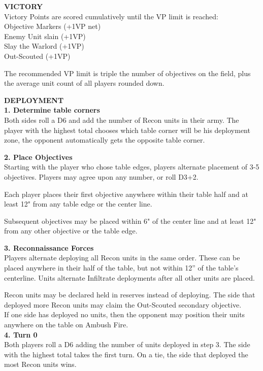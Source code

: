 \documentclass[letterpaper,twocolumn,oneside,titlepage]{book}
\begin{document}
\textbf{VICTORY}\\
Victory Points are scored cumulatively until the VP limit is reached:\\
Objective Markers (+1VP net)\\
Enemy Unit slain (+1VP)\\
Slay the Warlord (+1VP)\\
Out-Scouted (+1VP)

The recommended VP limit is triple the number of objectives on the
field, plus the average unit count of all players rounded down.

\textbf{DEPLOYMENT}\\
\textbf{1. Determine table corners}\\
Both sides roll a D6 and add the number of Recon units in their army.
The player with the highest total chooses which table corner will be his
deployment zone, the opponent automatically gets the opposite table
corner.

\textbf{2. Place Objectives}\\
Starting with the player who chose table edges, players alternate placement
of 3-5 objectives. Players may agree upon any number, or roll D3+2.

Each player places their first objective anywhere within their table half and
at least 12" from any table edge or the center line.

Subsequent objectives may be placed within 6" of the center line and at least
12" from any other objective or the table edge.



\textbf{3. Reconnaissance Forces}\\
Players alternate deploying all Recon units in the same order. These can
be placed anywhere in their half of the table, but not within 12'' of
the table's centerline. Units alternate Infiltrate deployments after all
other units are placed.

Recon units may be declared held in reserves instead of deploying. The
side that deployed more Recon units may claim the Out-Scouted secondary
objective.\\
If one side has deployed no units, then the opponent may position their
units anywhere on the table on Ambush Fire.\\
\textbf{4. Turn 0}\\
Both players roll a D6 adding the number of units deployed in step 3.
The side with the highest total takes the first turn. On a tie, the side
that deployed the most Recon units wins.
\end{document}
